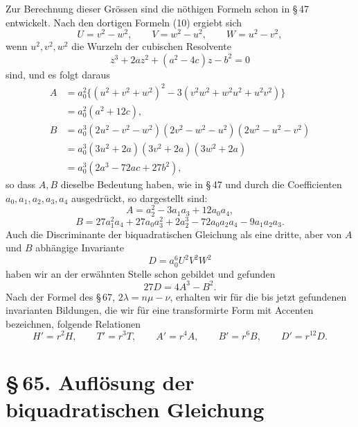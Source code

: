 \documentclass[11pt]{article}
\providecommand{\sect}[2]{\section*{\S\,#1. #2}}
\begin{document}
Zur Berechnung dieser Grössen sind die nöthigen Formeln schon in \S\,47 entwickelt. Nach den dortigen Formeln (10) ergiebt sich
\[
 U=v^2-w^2,
 \qquad
 V=w^2-u^2,
 \qquad
 W=u^2-v^2,
\]
wenn $u^2,v^2,w^2$ die Wurzeln der cubischen Resolvente
\[
 z^3+2az^2+(a^2-4c)z-b^2=0
\]
sind, und es folgt daraus
\[
\begin{aligned}
 A&=a_0^2\{(u^2+v^2+w^2)^2-3(v^2w^2+w^2u^2+u^2v^2)\}\\
  &=a_0^2(a^2+12c),\\
 B&=a_0^3(2u^2-v^2-w^2)(2v^2-w^2-u^2)(2w^2-u^2-v^2)\\
  &=a_0^3(3u^2+2a)(3v^2+2a)(3w^2+2a)\\
  &=a_0^3(2a^3-72ac+27b^2),
\end{aligned}
\]
so dass $A,B$ dieselbe Bedeutung haben, wie in \S\,47 und durch die Coefficienten $a_0,a_1,a_2,a_3,a_4$ ausgedrückt, so dargestellt sind:
\begin{equation}
 A=a_2^2-3a_1a_3+12a_0a_4,
\tag{8}
\end{equation}
\begin{equation}
 B=27a_1^2a_4+27a_0a_3^2+2a_2^3-72a_0a_2a_4-9a_1a_2a_3.
\tag{9}
\end{equation}
Auch die Discriminante der biquadratischen Gleichung als eine dritte, aber von $A$ und $B$ abhängige Invariante
\begin{equation}
 D=a_0^6U^2V^2W^2
\tag{10}
\end{equation}
haben wir an der erwähnten Stelle schon gebildet und gefunden
\begin{equation}
 27D=4A^3-B^2.
\tag{11}
\end{equation}
Nach der Formel des \S\,67, $2\lambda=n\mu-\nu$, erhalten wir für die bis jetzt gefundenen invarianten Bildungen, die wir für eine transformirte Form mit Accenten bezeichnen, folgende Relationen
\begin{equation}
 H'=r^2H,
 \qquad
 T'=r^3T,
 \qquad
 A'=r^4A,
 \qquad
 B'=r^6B,
 \qquad
 D'=r^{12}D.
\tag{12}
\end{equation}

\sect{65}{Auflösung der biquadratischen Gleichung}
\end{document}
